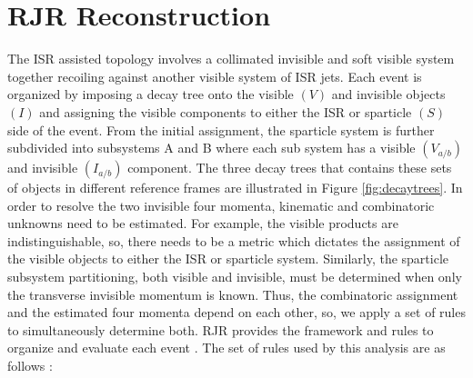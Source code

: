 \section{ RJR Reconstruction}
 The ISR assisted topology involves a collimated invisible and soft visible system together recoiling against another visible system of ISR jets. Each event is organized by imposing a decay tree onto the visible $(V)$ and invisible objects $(I)$ and assigning the visible components to either the ISR or sparticle $(S)$ side of the event. From the initial assignment, the sparticle system is further subdivided into subsystems A and B where each sub system has a visible $(V_{a/b})$ and invisible  $(I_{a/b})$ component. The three decay trees that contains these sets of objects in different reference frames are illustrated in Figure \ref{fig:decaytrees}. 
In order to resolve the two invisible four momenta, kinematic and combinatoric unknowns need to be estimated. For example, the visible products are indistinguishable, so, there needs to be a metric which dictates the assignment of the visible objects to either the ISR or sparticle system. Similarly, the sparticle subsystem partitioning, both visible and invisible, must be determined when only the transverse invisible momentum is known. Thus, the combinatoric assignment and the estimated four momenta depend on each other, so, we  apply a set of rules to simultaneously determine both.  RJR provides the framework and rules to organize and evaluate each event \cite{PhysRevD.96.112007}. The set of rules used by this analysis are as follows :
